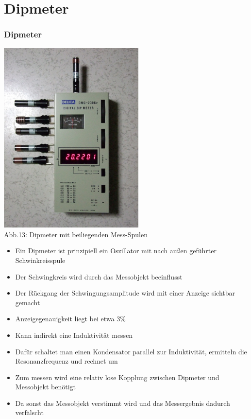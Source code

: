 \section*{Dipmeter}

\begin{frame}
    \frametitle{Dipmeter}
    \begin{center}
        \includegraphics[width=0.55\textwidth]{a16/Dipmeter.jpg}\\
        Abb.13: Dipmeter mit beiliegenden Mess-Spulen \cite{wmen}
	\end{center}
\end{frame}

\begin{frame}
	\begin{itemize}
		\item	Ein Dipmeter ist prinzipiell ein Oszillator mit nach außen geführter Schwinkreisspule
		\item	Der Schwingkreis wird durch das Messobjekt beeinflusst
		\item	Der Rückgang der Schwingungsamplitude wird mit einer Anzeige sichtbar gemacht
		\item	Anzeigegenauigkeit liegt bei etwa 3\%
		\item	Kann indirekt eine Induktivität messen
		\item	Dafür schaltet man einen Kondensator parallel zur Induktivität, ermitteln die Resonanzfrequenz und rechnet um
		\item	Zum messen wird eine relativ lose Kopplung zwischen Dipmeter und Messobjekt benötigt
		\item	Da sonst das Messobjekt verstimmt wird und das Messergebnis dadurch verfälscht
	\end{itemize}
\end{frame}

